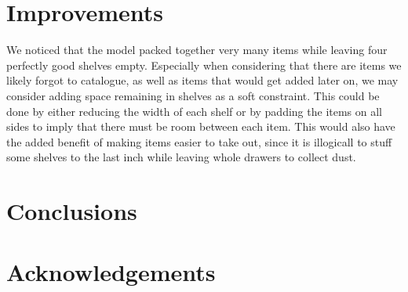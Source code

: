 \documentclass[10pt]{article}
\theoremstyle{named}
\begin{document}
\section{Improvements}
We noticed that the model packed together very many items while leaving four perfectly good shelves empty. Especially when considering that there are items we likely forgot to catalogue, as well as items that would get added later on, we may consider adding space remaining in shelves as a soft constraint. This could be done by either reducing the width of each shelf or by padding the items on all sides to imply that there must be room between each item. This would also have the added benefit of making items easier to take out, since it is illogicall to stuff some shelves to the last inch while leaving whole drawers to collect dust.

\section{Conclusions}


\section{Acknowledgements}
\end{document}
